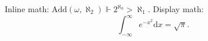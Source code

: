 \documentclass[a4paper]{article}
\title{\template{title}}
\author{\template{author}}
\begin{document}
\maketitle

\begin{abstract}
\end{abstract}

Inline math: $\mathrm{Add}(\omega, \aleph_2) \Vdash 2^{\aleph_0} > \aleph_1$.
Display math:
\[
 \int_{-\infty}^{\infty} e^{-x^2} \mathrm{d}x = \sqrt{\pi}.
\]
\end{document}
